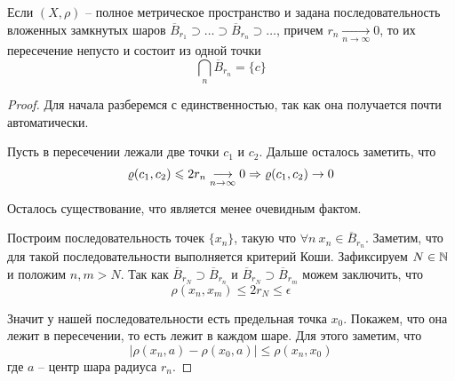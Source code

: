 \documentclass[../functional-analysis_17-18.tex]{subfiles}
\begin{document}
    \begin{theorem}
        Если $(X, \rho)$ -- полное метрическое пространство и задана последовательность вложенных замкнутых шаров $\overline{B}_{r_1} \supset \ldots \supset \overline{B}_{r_n} \supset \ldots $, причем $r_n \underset{n \to \infty}{\longrightarrow} 0$, то их пересечение непусто и состоит из одной точки
        \begin{equation}
            \bigcap_n \overline{B}_{r_n} = \{c\}
        \end{equation}
    \end{theorem}
	\begin{proof}
        Для начала разберемся с единственностью, так как она получается почти автоматически.
        
        Пусть в пересечении лежали две точки $c_1$  и  $c_2$. Дальше осталось заметить, что
        \begin{equation}
            \varrho(c_1, c_2) \leqslant 2r_n \underset{n \to \infty}{\longrightarrow} 0 \Rightarrow \varrho(c_1, c_2) \to 0
        \end{equation}
        
        Осталось существование, что является менее очевидным фактом.
        
        Построим последовательность точек $\{x_n\}$, такую что $\forall n \ x_n \in \overline{B}_{r_n}$. Заметим, что для такой последовательности выполняется критерий Коши. Зафиксируем $N \in \mathbb{N}$ и положим $n, m > N$.
        Так как $ \overline{B}_{r_N} \supset \overline{B}_{r_n} $ и $ \overline{B}_{r_N} \supset \overline{B}_{r_m} $ можем заключить, что 
        \begin{equation}
            \rho(x_n, x_m) \leq 2r_N \leq \epsilon
        \end{equation}
        
        Значит у нашей последовательности есть предельная точка $x_0$. Покажем, что она лежит в пересечении, то есть лежит в каждом шаре. Для этого заметим, что 
        \begin{equation}
            \left| \rho(x_n, a) - \rho(x_0, a) \right| \leq \rho(x_n, x_0)
        \end{equation}
        где $a$ -- центр шара радиуса $r_n$.
    \end{proof}
	
	
	
	
	
	
	
	
	
\end{document}
